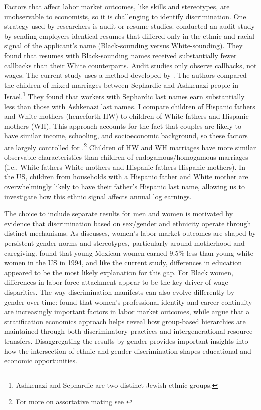Factors that affect labor market outcomes, like skills and stereotypes, are unobservable to economists, so it is challenging to identify discrimination. One strategy used by researchers is audit or resume studies. \textcite{bertrand2004emily} conducted an audit study by sending employers identical resumes that differed only in the ethnic and racial signal of the applicant’s name (Black-sounding versus White-sounding). They found that resumes with Black-sounding names received substantially fewer callbacks than their White counterparts. Audit studies only observe callbacks, not wages. The  current study uses a method developed by \textcite{rubinstein2014pride}. The authors compared the children of mixed marriages between Sephardic and Ashkenazi people in Israel.\footnote{Ashkenazi and Sephardic are two distinct Jewish ethnic groups.} They found that workers with Sephardic last names earn substantially less than those with Ashkenazi last names. I compare children of Hispanic fathers and White mothers (henceforth HW) to children of White fathers and Hispanic mothers (WH). This approach accounts for the fact that  couples are likely to have similar income, schooling, and socioeconomic background, so these factors are largely controlled for \autocite{averettBetterWorseRelationship2008, averettEconomicRealityBeauty1996}.\footnote{For more on assortative mating see \autocite{beckerTheoryMarriagePart1973, beckerTheoryMarriagePart1974, beckerTreatiseFamily1993, browningCollectiveUnitaryModels2006, chiapporiFatterAttractionAnthropometric2012}} Children of HW and WH marriages have more similar observable characteristics than children of endogamous/homogamous marriages (i.e., White fathers-White mothers and Hispanic fathers-Hispanic mothers). In the US, children  from households with a Hispanic father and White mother  are overwhelmingly likely to  have their father’s Hispanic last name, allowing us to investigate how this ethnic signal affects annual log earnings.

The choice to include separate results for men and women is motivated by evidence that discrimination based on sex/gender and ethnicity operate through distinct mechanisms. As \textcite{bertrand2020gender} discusses, women's labor market outcomes are shaped by persistent gender norms and stereotypes, particularly around motherhood and caregiving. \textcite{antecol2002relative} found that young Mexican women earned 9.5\% less than young white women in the US in 1994, and like the current study, differences in education appeared to be the most likely explanation for this gap. For Black women, differences in labor force attachment appear to be the key driver of wage disparities. The way discrimination manifests can also evolve differently by gender over time: \textcite{goldin2004making} found that women's professional identity and career continuity are increasingly important factors in labor market outcomes, while \textcite{darity2015tour} argue that a stratification economics approach helps reveal how group-based hierarchies are maintained through both discriminatory practices and intergenerational resource transfers. Disaggregating the results by gender provides important insights into how the intersection of ethnic and gender discrimination shapes educational and economic opportunities.


